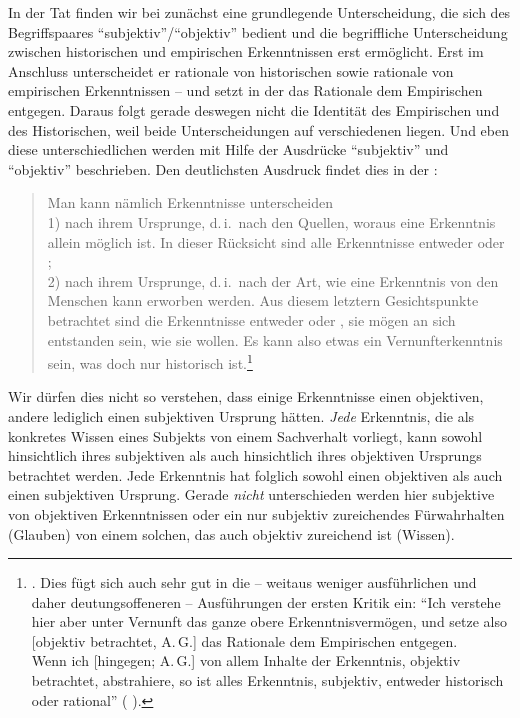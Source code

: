 In der Tat finden wir bei  zunächst eine grundlegende
Unterscheidung, die sich des Begriffspaares
\enquote{subjektiv}/\enquote{objektiv} bedient und die begriffliche
Unterscheidung zwischen historischen und empirischen Erkenntnissen erst
ermöglicht. Erst im Anschluss unterscheidet er  rationale von historischen sowie
rationale von empirischen Erkenntnissen -- und setzt in der  das Rationale dem Empirischen entgegen. Daraus folgt gerade
deswegen nicht die Identität des Empirischen und des Historischen, weil beide
Unterscheidungen auf verschiedenen  liegen. Und eben diese
unterschiedlichen  werden mit Hilfe der Ausdrücke
\enquote{subjektiv} und \enquote{objektiv} beschrieben. Den deutlichsten
Ausdruck findet dies in der {\jaeschelogik}:
\begin{quote}
 Man kann nämlich Erkenntnisse unterscheiden\\
 1) nach ihrem  Ursprunge, d.\,i.\ nach den Quellen, woraus eine
Erkenntnis allein möglich ist. In dieser Rücksicht sind alle Erkenntnisse
entweder  oder ;\\
 2) nach ihrem  Ursprunge, d.\,i.\ nach der Art, wie eine
Erkenntnis von den Menschen kann erworben werden. Aus diesem letztern
Gesichtspunkte betrachtet sind die Erkenntnisse entweder  oder
, sie mögen an sich entstanden sein, wie sie wollen. Es kann
also  etwas ein Vernunfterkenntnis sein, was  doch
nur historisch ist.\footnote{\cite[][A~20f.,]{Kant:ImmanuelKantsLogik1977}
\cite[][IX: 22.11--20]{Kant:GesammelteWerke1900ff.}. Dies fügt sich auch sehr
gut in die -- weitaus weniger ausführlichen und daher deutungsoffeneren -- Ausführungen der ersten Kritik ein:
\enquote{Ich verstehe hier aber unter Vernunft das ganze obere
Erkenntnisvermögen, und setze also [objektiv betrachtet, A.\,G.] das Rationale
dem Empirischen entgegen.\\
 Wenn ich [hingegen; A.\,G.] von allem Inhalte der Erkenntnis, objektiv
betrachtet, abstrahiere, so ist alles Erkenntnis, subjektiv, entweder historisch
oder rational} (\cite[][B~863f.,]{Kant:KritikderreinenVernunft2003}
\cite[][III: 540.27--31]{Kant:GesammelteWerke1900ff.}).}
\end{quote}
Wir dürfen dies nicht so verstehen, dass einige Erkenntnisse einen objektiven,
andere lediglich einen subjektiven Ursprung hätten. \emph{Jede} Erkenntnis, die
als konkretes Wissen eines Subjekts von einem Sachverhalt vorliegt, kann sowohl
hinsichtlich ihres subjektiven als auch hinsichtlich ihres objektiven Ursprungs
betrachtet werden. Jede Erkenntnis hat folglich sowohl einen objektiven als auch
einen subjektiven Ursprung. Gerade \emph{nicht} unterschieden werden hier
subjektive von objektiven Erkenntnissen oder ein nur subjektiv zureichendes
Fürwahrhalten (Glauben) von einem solchen, das auch objektiv zureichend ist
(Wissen).

